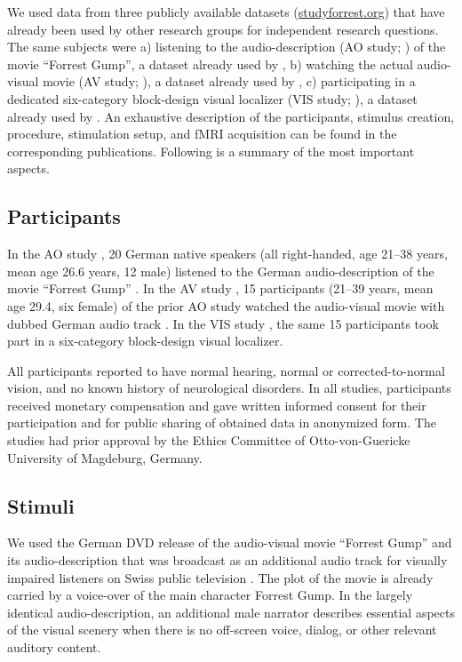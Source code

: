 \documentclass[english]{article}
\begin{document}
We used data from three publicly available datasets
(\href{http://www.studyforrest.org}{studyforrest.org}) that have already been
used by other research groups for independent research questions.
The same subjects were
a) listening to the audio-description (AO study; \citep{hanke2014audiomovie}) of
the movie ``Forrest Gump'', a dataset already used by \citep{hu2017decoding,
nguyen2016integration},
b) watching the actual audio-visual movie (AV study;
\citep{hanke2016simultaneous}), a dataset already used by
\citep{ben2018hippocampal},
c) participating in a dedicated six-category block-design visual localizer (VIS
study; \citep{sengupta2016extension}), a dataset already used by
\citep{jiahui2019predicting}.
An exhaustive description of the participants, stimulus creation, procedure,
stimulation setup, and fMRI acquisition can be found in the corresponding
publications. Following is a summary of the most important aspects.


\subsection{Participants}
In the AO study \citep{hanke2014audiomovie}, 20 German native speakers (all
right-handed, age 21–38 years, mean age 26.6 years, 12 male) listened to the
German audio-description \citep{ForrestGumpGermanAD} of the movie ``Forrest
Gump'' \citep{ForrestGumpMovie}.
In the AV study \citep{hanke2016simultaneous}, 15 participants (21–39 years,
mean age 29.4, six female) of the prior AO study watched the audio-visual movie
with dubbed German audio track \citep{ForrestGumpDVD}.
In the VIS study \citep{sengupta2016extension}, the same 15 participants took
part in a six-category block-design visual localizer.

All participants reported to have normal hearing, normal or corrected-to-normal
vision, and no known history of neurological disorders.
In all studies, participants received monetary compensation and gave written
informed consent for their participation and for public sharing of obtained data
in anonymized form. The studies had prior approval by the Ethics Committee of
Otto-von-Guericke University of Magdeburg, Germany.


\subsection{Stimuli}
We used the German DVD release \citep{ForrestGumpDVD} of the audio-visual movie
``Forrest Gump'' \citep{ForrestGumpMovie} and its audio-description that was
broadcast as an additional audio track for visually impaired listeners on Swiss
public television \citep{ForrestGumpGermanAD}.
The plot of the movie is already carried by a voice-over of the main character
Forrest Gump.
In the largely identical audio-description, an additional male narrator
describes essential aspects of the visual scenery when there is no off-screen
voice, dialog, or other relevant auditory content.
\end{document}
